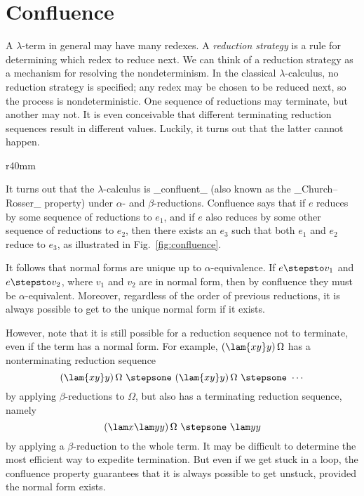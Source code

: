 \section{Confluence}

A $\lambda$-term in general may have many redexes. A \emph{reduction strategy} is a rule for determining which redex to reduce next. We can think of a reduction strategy as a mechanism for resolving the nondeterminism. In the classical $\lambda$-calculus, no reduction strategy is specified; any redex may be chosen to be reduced next, so the process is nondeterministic. One sequence of reductions may terminate, but another may not. It is even conceivable that different terminating reduction sequences result in different values. Luckily, it turns out that the latter cannot happen.

\begin{wrapfigure}[10]{r}{40mm}
 \caption{Confluence}
 \label{fig:confluence}
\end{wrapfigure}
It turns out that the $\lambda$-calculus is _confluent_ (also known as the _Church--Rosser_ property) under $\alpha$- and $\beta$-reductions. Confluence says that if $e$ reduces by some sequence of reductions to $e_1$, and if $e$ also reduces by some other sequence of reductions to $e_2$, then there exists an $e_3$ such that both $e_1$ and $e_2$ reduce to $e_3$, as illustrated in Fig.~\ref{fig:confluence}.

It follows that normal forms are unique up to $\alpha$-equivalence. If $e\stepsto v_1$ and $e\stepsto v_2$, where $v_1$ and $v_2$ are in normal form, then by confluence they must be $\alpha$-equivalent. Moreover, regardless of the order of previous reductions, it is always possible to get to the unique normal form if it exists.

However, note that it is still possible for a reduction sequence not to terminate, even if the term has a normal form. For example, $(\lam{xy}y)\,\Omega$ has a nonterminating reduction sequence
\[
(\lam{xy}y)\,\Omega\ \stepsone\ (\lam{xy}y)\,\Omega\ \stepsone\ \cdots
\]
by applying $\beta$-reductions to $\Omega$, but also has a terminating reduction sequence, namely
\[
(\lam x{\lam yy})\,\Omega\ \stepsone\ \lam yy
\]
by applying a $\beta$-reduction to the whole term.
It may be difficult to determine the most efficient way to expedite termination. But even if we get stuck in a loop, the confluence property guarantees that it is always possible to get unstuck, provided the normal form exists.
